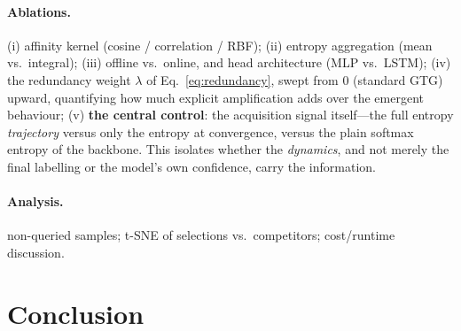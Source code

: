 \documentclass[11pt]{article}
\begin{document}

\paragraph{Ablations.} %
(i) affinity kernel (cosine / correlation / RBF);
(ii) entropy aggregation (mean vs.\ integral);
(iii) offline vs.\ online, and head architecture (MLP vs.\ LSTM);
(iv) the redundancy weight $\lambda$ of Eq.~\eqref{eq:redundancy}, swept from $0$
     (standard GTG) upward, quantifying how much explicit amplification adds over
     the emergent behaviour;
(v) \textbf{the central control}: the acquisition signal itself---the full entropy
     \emph{trajectory} versus only the entropy at convergence, versus the plain
     softmax entropy of the backbone. This isolates whether the \emph{dynamics},
     and not merely the final labelling or the model's own confidence, carry the
     information.

\paragraph{Analysis.} %
non-queried samples; t-SNE of selections vs.\ competitors; cost/runtime discussion.

\section{Conclusion}
\end{document}
